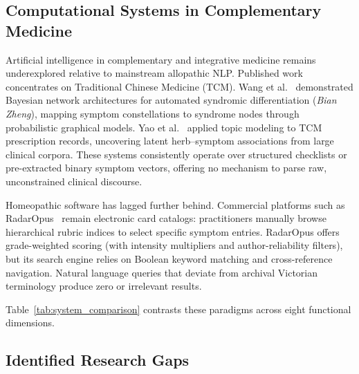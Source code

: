 \subsection{Computational Systems in Complementary Medicine}

Artificial intelligence in complementary and integrative medicine remains underexplored relative to mainstream allopathic NLP. Published work concentrates on Traditional Chinese Medicine (TCM). Wang et al.~\cite{wang2006bayesian} demonstrated Bayesian network architectures for automated syndromic differentiation (\textit{Bian Zheng}), mapping symptom constellations to syndrome nodes through probabilistic graphical models. Yao et al.~\cite{yao2018topic} applied topic modeling to TCM prescription records, uncovering latent herb--symptom associations from large clinical corpora. These systems consistently operate over structured checklists or pre-extracted binary symptom vectors, offering no mechanism to parse raw, unconstrained clinical discourse.

Homeopathic software has lagged further behind. Commercial platforms such as RadarOpus~\cite{radaropus2024} remain electronic card catalogs: practitioners manually browse hierarchical rubric indices to select specific symptom entries. RadarOpus offers grade-weighted scoring (with intensity multipliers and author-reliability filters), but its search engine relies on Boolean keyword matching and cross-reference navigation. Natural language queries that deviate from archival Victorian terminology produce zero or irrelevant results.

Table~\ref{tab:system_comparison} contrasts these paradigms across eight functional dimensions.

\subsection{Identified Research Gaps}

